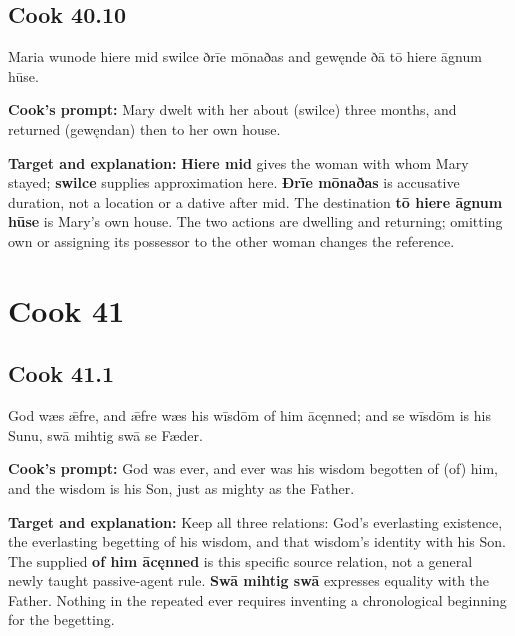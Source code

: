 \par\begin{minipage}{\linewidth}\raggedright
\subsection*{Cook 40.10}

Maria wunode hiere mid swilce ðrīe mōnaðas and gewęnde ðā tō hiere āgnum hūse.

\textbf{Cook's prompt:} Mary dwelt with her about (swilce) three months, and returned (gewęndan) then to her own house.

\textbf{Target and explanation:} \textbf{Hiere mid} gives the woman with whom Mary stayed; \textbf{swilce} supplies approximation here. \textbf{Ðrīe mōnaðas} is accusative duration, not a location or a dative after mid. The destination \textbf{tō hiere āgnum hūse} is Mary's own house. The two actions are dwelling and returning; omitting own or assigning its possessor to the other woman changes the reference.

\end{minipage}\par\addvspace{4pt}

\clearpage
\section*{Cook 41}

\par\begin{minipage}{\linewidth}\raggedright
\subsection*{Cook 41.1}

God wæs ǣfre, and ǣfre wæs his wīsdōm of him ācęnned; and se wīsdōm is his Sunu, swā mihtig swā se Fæder.

\textbf{Cook's prompt:} God was ever, and ever was his wisdom begotten of (of) him, and the wisdom is his Son, just as mighty as the Father.

\textbf{Target and explanation:} Keep all three relations: God's everlasting existence, the everlasting begetting of his wisdom, and that wisdom's identity with his Son. The supplied \textbf{of him ācęnned} is this specific source relation, not a general newly taught passive-agent rule. \textbf{Swā mihtig swā} expresses equality with the Father. Nothing in the repeated ever requires inventing a chronological beginning for the begetting.

\end{minipage}\par\addvspace{4pt}

